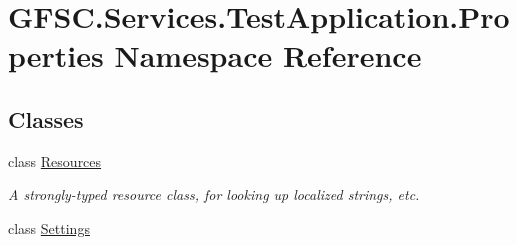 \hypertarget{namespace_g_f_s_c_1_1_services_1_1_test_application_1_1_properties}{}\section{G\+F\+S\+C.\+Services.\+Test\+Application.\+Properties Namespace Reference}
\label{namespace_g_f_s_c_1_1_services_1_1_test_application_1_1_properties}
\subsection*{Classes}
\begin{DoxyCompactItemize}
\item 
class \mbox{\hyperlink{class_g_f_s_c_1_1_services_1_1_test_application_1_1_properties_1_1_resources}{Resources}}
\begin{DoxyCompactList}\small\item\em A strongly-\/typed resource class, for looking up localized strings, etc. \end{DoxyCompactList}\item 
class \mbox{\hyperlink{class_g_f_s_c_1_1_services_1_1_test_application_1_1_properties_1_1_settings}{Settings}}
\end{DoxyCompactItemize}
